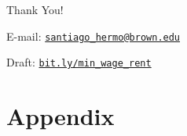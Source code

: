 \documentclass[aspectratio=169, t]{beamer}
\begin{document}
\begin{frame}[c]
    \Large Thank You!

    \vspace{3mm}
    \normalsize E-mail: \texttt{\url{santiago_hermo@brown.edu}}

    \vspace{2mm}
    \normalsize Draft: \texttt{\url{bit.ly/min_wage_rent}}
\end{frame}


\appendix

\renewcommand\thetable{\thesection.\arabic{table}}
\renewcommand\thefigure{\thesection.\arabic{figure}} 
\setcounter{table}{0}
\setcounter{figure}{0}

\section{Appendix}
\end{document}
